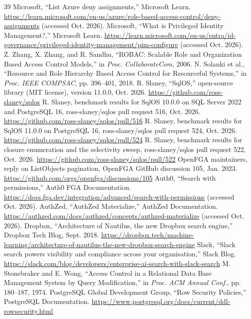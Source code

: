 \documentclass[conference]{IEEEtran}
\begin{document}
\begin{thebibliography}{39}
 Microsoft, ``List Azure deny assignments,'' Microsoft Learn. \url{https://learn.microsoft.com/en-us/azure/role-based-access-control/deny-assignments} (accessed Oct. 2026).
 Microsoft, ``What is Privileged Identity Management?,'' Microsoft Learn. \url{https://learn.microsoft.com/en-us/entra/id-governance/privileged-identity-management/pim-configure} (accessed Oct. 2026).
 Z. Zhang, X. Zhang, and R. Sandhu, ``ROBAC: Scalable Role and Organization Based Access Control Models,'' in \emph{Proc. CollaborateCom}, 2006.
 N. Solanki et al., ``Resource and Role Hierarchy Based Access Control for Resourceful Systems,'' in \emph{Proc. IEEE COMPSAC}, pp. 396--401, 2018.
 R. Slaney, ``SqlOS,'' open-source library (MIT license), version 11.0.0, Oct. 2026. \url{https://github.com/ross-slaney/sqlos}
 R. Slaney, benchmark results for SqlOS 10.0.0 on SQL Server 2022 and PostgreSQL 16, ross-slaney/sqlos pull request 516, Oct. 2026. \url{https://github.com/ross-slaney/sqlos/pull/516}
 R. Slaney, benchmark results for SqlOS 11.0.0 on PostgreSQL 16, ross-slaney/sqlos pull request 524, Oct. 2026. \url{https://github.com/ross-slaney/sqlos/pull/524}
 R. Slaney, benchmark results for closure enumeration and the selectivity sweep, ross-slaney/sqlos pull request 522, Oct. 2026. \url{https://github.com/ross-slaney/sqlos/pull/522}
 OpenFGA maintainers, reply on ListObjects pagination, OpenFGA GitHub discussion 105, Jan. 2023. \url{https://github.com/orgs/openfga/discussions/105}
 Auth0, ``Search with permissions,'' Auth0 FGA Documentation. \url{https://docs.fga.dev/integration/advanced/search-with-permissions} (accessed Oct. 2026).
 AuthZed, ``AuthZed Materialize,'' AuthZed Documentation. \url{https://authzed.com/docs/authzed/concepts/authzed-materialize} (accessed Oct. 2026).
 Dropbox, ``Architecture of Nautilus, the new Dropbox search engine,'' Dropbox Tech Blog, Sept. 2018. \url{https://dropbox.tech/machine-learning/architecture-of-nautilus-the-new-dropbox-search-engine}
 Slack, ``Slack search powers visibility and compliance across your organisation,'' Slack Blog. \url{https://slack.com/blog/developers/enterprise-ai-search-with-slack-search}
 M. Stonebraker and E. Wong, ``Access Control in a Relational Data Base Management System by Query Modification,'' in \emph{Proc. ACM Annual Conf.}, pp. 180--187, 1974.
 PostgreSQL Global Development Group, ``Row Security Policies,'' PostgreSQL Documentation. \url{https://www.postgresql.org/docs/current/ddl-rowsecurity.html}

\end{thebibliography}
\end{document}
